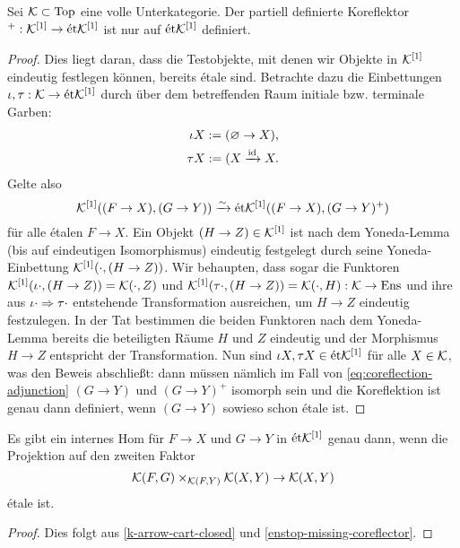 \begin{satz} \label{enstop-missing-coreflector}
  Sei $\mathcal{K} \subset \operatorname{Top}$ eine volle Unterkategorie. Der partiell
  definierte Koreflektor $^+: \mathcal{K}^{[1]} \to \mathrm{\acute{e}t} \mathcal{K}^{[1]}$ ist nur auf
  $\mathrm{\acute{e}t} \mathcal{K}^{[1]}$ definiert.
\end{satz}
\begin{proof}
  Dies liegt daran, dass die Testobjekte, mit denen wir Objekte in
  $\mathcal{K}^{[1]}$ eindeutig festlegen können, bereits étale sind. Betrachte
  dazu die Einbettungen $\iota, \tau: \mathcal{K} \to \mathrm{\acute{e}t} \mathcal{K}^{[1]}$ durch über
  dem betreffenden Raum initiale bzw. terminale Garben:
  \begin{align*}
    \iota X := (\varnothing \to X), \\
    \tau X := (X \xrightarrow{\operatorname{id}} X.
  \end{align*}
  Gelte also
  \begin{equation} \label{eq:coreflection-adjunction}
    \mathcal{K}^{[1]}((F \to X), (G \to Y)) \xrightarrow[]{\sim} \mathrm{\acute{e}t} \mathcal{K}^{[1]}((F \to X), (G \to Y)^+)
  \end{equation}
  für alle étalen $F \to X$. Ein Objekt $(H \to Z) \in \mathcal{K}^{[1]}$ ist
  nach dem Yoneda-Lemma (bis auf eindeutigen Isomorphismus) eindeutig
  festgelegt durch seine Yoneda-Einbettung $\mathcal{K}^{[1]}(\cdot, (H \to
  Z))$. Wir behaupten, dass sogar die Funktoren $\mathcal{K}^{[1]}(\iota \cdot,
  (H \to Z)) = \mathcal{K}(\cdot, Z)$ und $\mathcal{K}^{[1]}(\tau \cdot, (H \to Z)) =
  \mathcal{K}(\cdot, H): \mathcal{K} \to \operatorname{Ens}$ und ihre aus $\iota \cdot \Rightarrow \tau
  \cdot$ entstehende Transformation ausreichen, um $H \to Z$ eindeutig
  festzulegen. In der Tat bestimmen die beiden Funktoren nach dem
  Yoneda-Lemma bereits die beteiligten Räume $H$ und $Z$ eindeutig und
  der Morphismus $H \to Z$ entspricht der Transformation. Nun sind
  $\iota X, \tau X \in \mathrm{\acute{e}t} \mathcal{K}^{[1]}$ für alle $X \in \mathcal{K}$, was den
  Beweis abschließt: dann müssen nämlich im Fall von
  \ref{eq:coreflection-adjunction} $(G \to Y)$ und $(G \to Y)^+$
  isomorph sein und die Koreflektion ist genau dann definiert, wenn
  $(G \to Y)$ sowieso schon étale ist.
\end{proof}
\begin{kor}
  Es gibt ein internes Hom für $F \to X$ und $G \to Y$ in $\mathrm{\acute{e}t}
  \mathcal{K}^{[1]}$ genau dann, wenn die Projektion auf den zweiten Faktor
  \[ \mathcal{K}(F, G) \times_{\mathcal{K}(F, Y)} \mathcal{K}(X, Y) \to \mathcal{K}(X, Y) \]
  étale ist.
\end{kor}
\begin{proof}
  Dies folgt aus \ref{k-arrow-cart-closed} und
  \ref{enstop-missing-coreflector}.
\end{proof}
